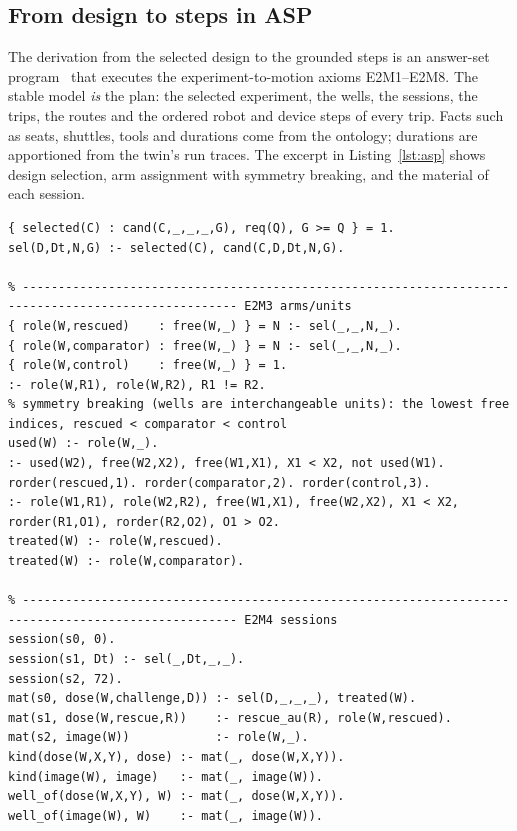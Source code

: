 \documentclass[10pt,a4paper]{article}
\begin{document}
\subsection{From design to steps in ASP}\label{sec:asp}

The derivation from the selected design to the grounded steps is an answer-set program~\citep{gebser2019} that executes the experiment-to-motion axioms E2M1–E2M8. The stable model \emph{is} the plan: the selected experiment, the wells, the sessions, the trips, the routes and the ordered robot and device steps of every trip. Facts such as seats, shuttles, tools and durations come from the ontology; durations are apportioned from the twin's run traces. The excerpt in Listing~\ref{lst:asp} shows design selection, arm assignment with symmetry breaking, and the material of each session.

\begin{listing}[tbp]
\begin{Verbatim}[fontsize=\footnotesize,breaklines,frame=lines,framesep=2mm]
% ---------------------------------------------------------------------------------------------------- E2M1 selection
{ selected(C) : cand(C,_,_,_,G), req(Q), G >= Q } = 1.
sel(D,Dt,N,G) :- selected(C), cand(C,D,Dt,N,G).

% ---------------------------------------------------------------------------------------------------- E2M3 arms/units
{ role(W,rescued)    : free(W,_) } = N :- sel(_,_,N,_).
{ role(W,comparator) : free(W,_) } = N :- sel(_,_,N,_).
{ role(W,control)    : free(W,_) } = 1.
:- role(W,R1), role(W,R2), R1 != R2.
% symmetry breaking (wells are interchangeable units): the lowest free indices, rescued < comparator < control
used(W) :- role(W,_).
:- used(W2), free(W2,X2), free(W1,X1), X1 < X2, not used(W1).
rorder(rescued,1). rorder(comparator,2). rorder(control,3).
:- role(W1,R1), role(W2,R2), free(W1,X1), free(W2,X2), X1 < X2, rorder(R1,O1), rorder(R2,O2), O1 > O2.
treated(W) :- role(W,rescued).
treated(W) :- role(W,comparator).

% ---------------------------------------------------------------------------------------------------- E2M4 sessions
session(s0, 0).
session(s1, Dt) :- sel(_,Dt,_,_).
session(s2, 72).
mat(s0, dose(W,challenge,D)) :- sel(D,_,_,_), treated(W).
mat(s1, dose(W,rescue,R))    :- rescue_au(R), role(W,rescued).
mat(s2, image(W))            :- role(W,_).
kind(dose(W,X,Y), dose) :- mat(_, dose(W,X,Y)).
kind(image(W), image)   :- mat(_, image(W)).
well_of(dose(W,X,Y), W) :- mat(_, dose(W,X,Y)).
well_of(image(W), W)    :- mat(_, image(W)).
\end{Verbatim}
\caption{Excerpt of the experiment-to-motion axioms in ASP (selection, arms, sessions).}\label{lst:asp}
\end{listing}
\end{document}
